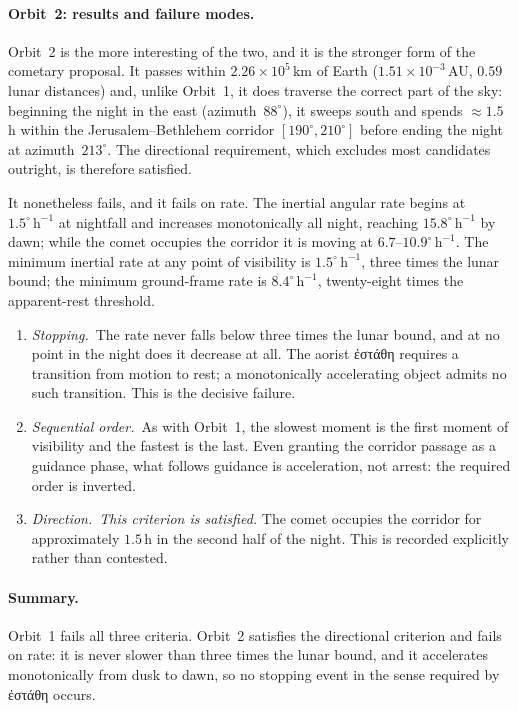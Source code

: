 \documentclass[11pt,a4paper]{article}
\newcommand{\grk}[1]{{\fontencoding{LGR}\selectfont #1}}
\newcommand{\grk}[1]{{\greekfont #1}}
\begin{document}
\paragraph{Orbit~2: results and failure modes.}
Orbit~2 is the more interesting of the two, and it is the stronger form of
the cometary proposal.  It passes within $2.26\times10^{5}$\,km of Earth
($1.51\times10^{-3}$\,AU, $0.59$ lunar distances) and, unlike Orbit~1, it
does traverse the correct part of the sky: beginning the night in the east
(azimuth~$88^\circ$), it sweeps south and spends ${\approx}1.5$\,h within
the Jerusalem--Bethlehem corridor $[190^\circ, 210^\circ]$ before ending the
night at azimuth~$213^\circ$.  The directional requirement, which excludes
most candidates outright, is therefore satisfied.

It nonetheless fails, and it fails on rate.  The inertial angular rate
begins at $1.5^\circ\,\mathrm{h}^{-1}$ at nightfall and increases
monotonically all night, reaching $15.8^\circ\,\mathrm{h}^{-1}$ by dawn;
while the comet occupies the corridor it is moving at
$6.7$--$10.9^\circ\,\mathrm{h}^{-1}$.  The minimum inertial rate at any
point of visibility is $1.5^\circ\,\mathrm{h}^{-1}$, three times the lunar
bound; the minimum ground-frame rate is $8.4^\circ\,\mathrm{h}^{-1}$,
twenty-eight times the apparent-rest threshold.

\begin{enumerate}
  \item \textit{Stopping.}~The rate never falls below three times the lunar
    bound, and at no point in the night does it decrease at all.  The
    aorist \grk{ἐστάθη} requires a transition from motion to rest; a
    monotonically accelerating object admits no such transition.  This is
    the decisive failure.
  \item \textit{Sequential order.}~As with Orbit~1, the slowest moment is
    the first moment of visibility and the fastest is the last.  Even
    granting the corridor passage as a guidance phase, what follows
    guidance is acceleration, not arrest: the required order is inverted.
  \item \textit{Direction.}~\emph{This criterion is satisfied.}  The comet
    occupies the corridor for approximately $1.5$\,h in the second half of
    the night.  This is recorded explicitly rather than contested.
\end{enumerate}

\paragraph{Summary.}
Orbit~1 fails all three criteria.  Orbit~2 satisfies the directional
criterion and fails on rate: it is never slower than three times the lunar
bound, and it accelerates monotonically from dusk to dawn, so no stopping
event in the sense required by \grk{ἐστάθη} occurs.
\end{document}
